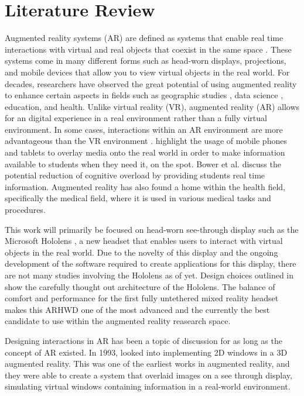 \section{Literature Review}
\label{sec:literaturereview}
Augmented reality systems (AR) are defined as systems that enable real time interactions with virtual and real objects that coexist in the same space \cite{Azuma1997}. These systems come in many different forms such as head-worn displays, projections, and mobile devices that allow you to view virtual objects in the real world. For decades, researchers have observed the great potential of using augmented reality to enhance certain aspects in fields such as geographic studies \cite{Wang2018}, data science \cite{Zhang2018}, education, and health. Unlike virtual reality (VR), augmented reality (AR) allows for an digital experience in a real environment rather than a fully virtual environment. In some cases, interactions within an AR environment are more advantageous than the VR environment \cite{Krichenbauer2017}. \cite{Bower2014} highlight the usage of mobile phones and tablets to overlay media onto the real world in order to make information available to students when they need it, on the spot. Bower et al. discuss the potential reduction of cognitive overload by providing students real time information. Augmented reality has also found a home within the health field, specifically the medical field, where it is used in various medical tasks and procedures.

This work will primarily be focused on head-worn see-through display such as the Microsoft Hololens \cite{Hololens}, a new headset that enables users to interact with virtual objects in the real world. Due to the novelty of this display and the ongoing development of the software required to create applications for this display, there are not many studies involving the Hololens as of yet. Design choices outlined in \cite{Kress2017} show the carefully thought out architecture of the Hololens. The balance of comfort and performance for the first fully untethered mixed reality headset makes this ARHWD one of the most advanced and the currently the best candidate to use within the augmented reality reasearch space. 

Designing interactions in AR has been a topic of discussion for as long as the concept of AR existed. In 1993, \cite{Feiner1993} looked into implementing 2D windows in a 3D augmented reality. This was one of the earliest works in augmented reality, and they were able to create a system that overlaid images on a see through display, simulating virtual windows containing information in a real-world environment.

